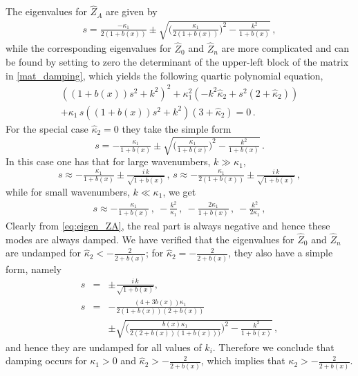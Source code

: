 \documentclass[reprint,aps,amsmath,amssymb,twoside,prd,showkeys,superscriptaddress,nofootinbib]{revtex4-2}
\begin{document}
The eigenvalues for $\hat{Z}_A$ are given by
\begin{eqnarray}
s=\tfrac{-\kappa_1}{2(1+b(x))}\pm\sqrt{\big(\tfrac{\kappa_1}{2(1+b(x))}\big)^2-\tfrac{k^2}{1+b(x)}}\,,
\end{eqnarray}
while the corresponding eigenvalues for $\hat{Z}_0$ and  $\hat{Z}_n$ are more complicated and can be found by setting to zero the determinant of the upper-left block of the matrix in \eqref{mat_damping}, which yields the following quartic polynomial equation,
\begin{eqnarray}
    \left((1+b(x))s^2+k^2\right)^2 +\kappa_1^2\left(-k^2\hat{\kappa}_2+s^2(2+\hat{\kappa}_2)\right) \nonumber\\+ \kappa_1\,s \left((1+b(x))s^2+k^2\right)(3+\hat{\kappa}_2)=0\,.
\end{eqnarray}
For the special case $\hat{\kappa}_2=0$ they take the simple form
\begin{equation}
s=-\tfrac{\kappa_1}{1+b(x)}\pm\sqrt{\big(\tfrac{\kappa_1}{1+b(x)}\big)^2-\tfrac{k^2}{1+b(x)}}\,.
\label{eq:eigen_ZA}
\end{equation}
In this case one has that for large wavenumbers, $k\gg \kappa_1$,
\begin{equation}
s\approx -\tfrac{\kappa_1}{1+b(x)}\pm \tfrac{i\,k}{\sqrt{1+b(x)}}\,,\,  s\approx -\tfrac{\kappa_1}{2(1+b(x))}\pm\tfrac{i\,k}{\sqrt{1+b(x)}}\,,
\end{equation}
while for small wavenumbers, $k\ll \kappa_1$, we get
\begin{eqnarray}
s\approx -\tfrac{\kappa_1}{1+b(x)}\,,~ -\tfrac{k^2}{\kappa_1}\,,~ -\tfrac{2\kappa_1}{1+b(x)}\,,~ -\tfrac{k^2}{2\kappa_1}\,,
\end{eqnarray}
Clearly from \eqref{eq:eigen_ZA}, the real part is always negative and hence these modes are always damped.  We have verified that the eigenvalues for $\hat{Z}_0$ and $\hat{Z}_n$ are undamped for  $\hat{\kappa}_2<-\tfrac{2}{2+b(x)}$; for $\hat{\kappa}_2=-\tfrac{2}{2+b(x)}$, they also have a simple form, namely
\begin{eqnarray}
s&=&\pm\tfrac{i\,k}{\sqrt{1+b(x)}}, \\
s&=&-\tfrac{(4+3b(x))\kappa_1}{2(1+b(x))(2+b(x))}\nonumber\\&&\pm\sqrt{\big(\tfrac{b(x)\kappa_1}{2(2+b(x))(1+b(x)))}\big)^2-\tfrac{k^2}{1+b(x)}}\,,
\end{eqnarray}
and hence they are undamped for all values of $k_i$. Therefore we conclude that damping occurs for $\kappa_1>0$ and $\hat{\kappa}_2>-\frac{2}{2+b(x)}$, which implies that $\kappa_2>-\frac{2}{2+b(x)}$.
\end{document}
